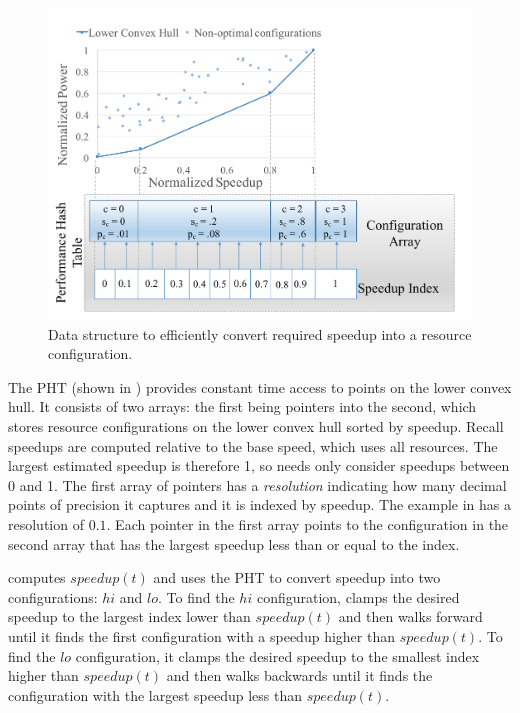 \begin{figure}
\includegraphics[width=\columnwidth]{figures/performance-hash-table.pdf}
\caption{Data structure to efficiently convert required speedup into a
  resource configuration.}
  \label{fig:pht}
\end{figure}

The PHT (shown in ) provides constant time access to
points on the lower convex hull.  It consists of two arrays: the first
being pointers into the second, which stores resource configurations
on the lower convex hull sorted by speedup.  Recall speedups are
computed relative to the base speed, which uses all resources.  The
largest estimated speedup is therefore 1, so \SYSTEM{} needs only
consider speedups between 0 and 1.  The first array of pointers has a
\emph{resolution} indicating how many decimal points of precision it
captures and it is indexed by speedup.  The example in
 has a resolution of $0.1$.  Each pointer in the first
array points to the configuration in the second array that has the
largest speedup less than or equal to the index.

\SYSTEM{} computes $speedup(t)$ and uses the PHT to convert speedup
into two configurations: $hi$ and $lo$.  To find the $hi$
configuration, \SYSTEM{} clamps the desired speedup to the largest
index lower than $speedup(t)$ and then walks forward until it finds
the first configuration with a speedup higher than $speedup(t)$.  To
find the $lo$ configuration, it clamps the desired speedup to the
smallest index higher than $speedup(t)$ and then walks backwards until
it finds the configuration with the largest speedup less than
$speedup(t)$.

